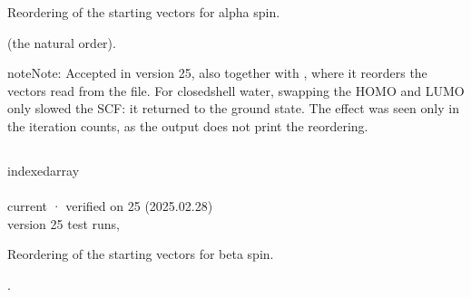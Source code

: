 \documentclass[letterpaper,10pt,english,openany,oneside]{sphinxmanual}
\begin{document}
\sphinxAtStartPar
Reordering of the starting vectors for alpha spin.

\sphinxAtStartPar
{}  (the natural order).

\begin{sphinxadmonition}{note}{Note:}
\sphinxAtStartPar
Accepted in version 25, also together with , where it reorders the vectors read from the file. For
closed\sphinxhyphen{}shell water, swapping the HOMO and LUMO only slowed the SCF: it returned to the ground state. The
effect was seen only in the iteration counts, as the output does not print the reordering.
\end{sphinxadmonition}

\sphinxAtStartPar
{}

\begin{sphinxVerbatim}[commandchars=\\\{\}]
\end{sphinxVerbatim}

\sphinxAtStartPar
{} {\hyperref[\detokenize{reference/guess:guess-nb}]{}}


\subsection{}
\label{\detokenize{reference/guess:nb}}\label{\detokenize{reference/guess:guess-nb}}
\ignorespaces 
\sphinxAtStartPar
{} indexed\sphinxhyphen{}array\\
 \\
 current · verified on 25 (2025.02.28)\\
 version 25 test runs, 

\sphinxAtStartPar
Reordering of the starting vectors for beta spin.

\sphinxAtStartPar
{} .
\end{document}
